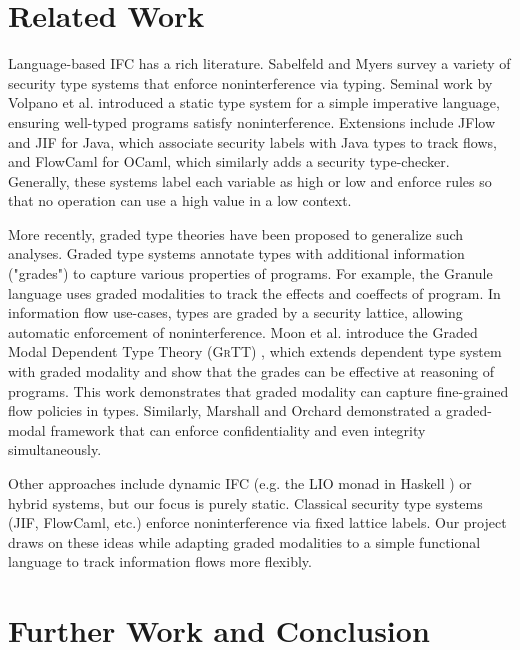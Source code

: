 \documentclass[conference]{IEEEtran}
\begin{document}
\section{Related Work}

Language-based IFC has a rich literature. Sabelfeld and Myers \cite{sabelfeld2003language} survey a variety of security type systems that enforce noninterference via typing. Seminal work by Volpano et al. \cite{volpano1996sound} introduced a static type system for a simple imperative language, ensuring well-typed programs satisfy noninterference. Extensions include JFlow \cite{myers1999jflow} and JIF \cite{pullicino2014jif} for Java, which associate security labels with Java types to track flows, and FlowCaml \cite{simonet2003flow} for OCaml, which similarly adds a security type-checker. Generally, these systems label each variable as high or low and enforce rules so that no operation can use a high value in a low context.

More recently, graded type theories have been proposed to generalize such analyses. Graded type systems annotate types with additional information ("grades") to capture various properties of programs. For example, the Granule language \cite{orchard2019quantitative} uses graded modalities to track the effects and coeffects of program. In information flow use-cases, types are graded by a security lattice, allowing automatic enforcement of noninterference. Moon et al. introduce the Graded Modal Dependent Type Theory (\textsc{GrTT}) \cite{moon2021graded}, which extends dependent type system with graded modality and show that the grades can be effective at reasoning of programs. This work demonstrates that graded modality can capture fine-grained flow policies in types. Similarly, Marshall and Orchard \cite{marshall2023graded} demonstrated a graded-modal framework that can enforce confidentiality and even integrity simultaneously.

Other approaches include dynamic IFC (e.g. the LIO monad in Haskell \cite{stefan2011flexible}) or hybrid systems, but our focus is purely static. Classical security type systems (JIF, FlowCaml, etc.) enforce noninterference via fixed lattice labels. Our project draws on these ideas while adapting graded modalities to a simple functional language to track information flows more flexibly.

\section{Further Work and Conclusion}
\end{document}
